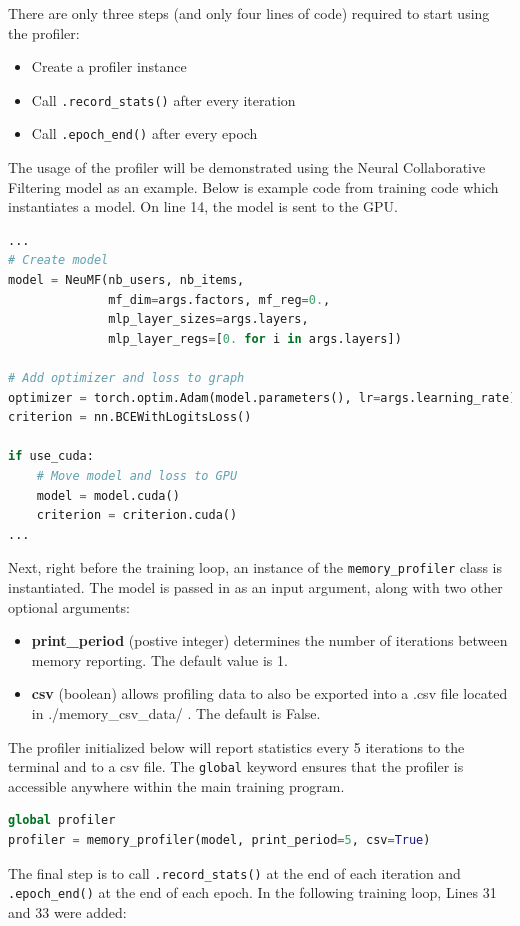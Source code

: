 \documentclass[12pt,letterpaper]{article}
\newenvironment{myitemize}
{ \begin{itemize}
    \setlength{\itemsep}{0pt}
    \setlength{\parskip}{0pt}
    \setlength{\parsep}{0pt}     }
{ \end{itemize}                  }
\begin{document}
There are only three steps (and only four lines of code) required to start using the profiler:
\begin{myitemize}
\item Create a profiler instance
\item Call \texttt{.record\_stats()} after every iteration
\item Call \texttt{.epoch\_end()} after every epoch
\end{myitemize}
The usage of the profiler will be demonstrated using the Neural Collaborative Filtering model as an example. Below is example code from training code \cite{tbd_suite} which instantiates a model. On line 14, the model is sent to the GPU.
\begin{lstlisting}[language=Python]
...
# Create model
model = NeuMF(nb_users, nb_items,
              mf_dim=args.factors, mf_reg=0.,
              mlp_layer_sizes=args.layers,
              mlp_layer_regs=[0. for i in args.layers])

# Add optimizer and loss to graph
optimizer = torch.optim.Adam(model.parameters(), lr=args.learning_rate)
criterion = nn.BCEWithLogitsLoss()

if use_cuda:
    # Move model and loss to GPU
    model = model.cuda()
    criterion = criterion.cuda()
...
\end{lstlisting}
Next, right before the training loop, an instance of the \texttt{memory\_profiler} class is instantiated. The model is passed in as an input argument, along with two other optional arguments:
\begin{myitemize}
\item \textbf{print\_period} (postive integer) determines the number of iterations between memory reporting. The default value is 1.
\item \textbf{csv} (boolean) allows profiling data to also be exported into a .csv file located in ./memory\_csv\_data/ . The default is False.
\end{myitemize}
The profiler initialized below will report statistics every 5 iterations to the terminal and to a csv file. The \texttt{global} keyword ensures that the profiler is accessible anywhere within the main training program.
\begin{lstlisting}[language=Python]
global profiler
profiler = memory_profiler(model, print_period=5, csv=True)
\end{lstlisting}
The final step is to call \texttt{.record\_stats()} at the end of each iteration and \texttt{.epoch\_end()} at the end of each epoch. In the following training loop, Lines 31 and 33 were added:
\end{document}
